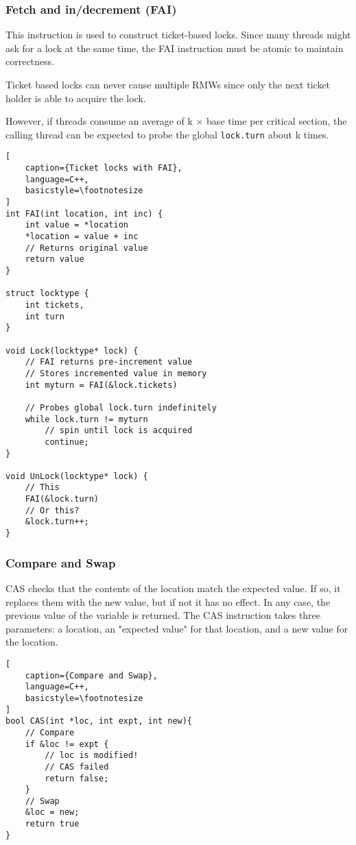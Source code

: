 \documentclass{article}
\begin{document}
\begin{multicols*}{2}
\subsubsection{Fetch and in/decrement (FAI)}
This instruction is used to construct ticket-based locks. Since many threads might ask for a lock at the same time, the FAI instruction must be atomic to maintain correctness.
\medskip\par\noindent
Ticket based locks can never cause multiple RMWs since only the next ticket holder is able to acquire the lock.
\medskip\par\noindent
However, if threads consume an average of k $\times$ base time per critical section, the calling thread can be expected to probe the global \texttt{lock.turn} about k times.

\begin{lstlisting}[
    caption={Ticket locks with FAI},
    language=C++, 
    basicstyle=\footnotesize
]
int FAI(int location, int inc) {
    int value = *location
    *location = value + inc
    // Returns original value
    return value
}

struct locktype {
    int tickets,
    int turn
}

void Lock(locktype* lock) {
    // FAI returns pre-increment value
    // Stores incremented value in memory
    int myturn = FAI(&lock.tickets)
    
    // Probes global lock.turn indefinitely
    while lock.turn != myturn
        // spin until lock is acquired
        continue;
}

void UnLock(locktype* lock) {
    // This
    FAI(&lock.turn)
    // Or this?
    &lock.turn++;
}
\end{lstlisting}

\subsubsection{Compare and Swap}
CAS checks that the contents of the location match the expected value. If so, it replaces them with the new value, but if not it has no effect. In any case, the previous value of the variable is returned. The CAS instruction takes three parameters: a location, an "expected value" for that location, and a new value for the location.

\begin{lstlisting}[
    caption={Compare and Swap},
    language=C++, 
    basicstyle=\footnotesize
]
bool CAS(int *loc, int expt, int new){
    // Compare
    if &loc != expt {
        // loc is modified!
        // CAS failed
        return false;
    }
    // Swap
    &loc = new;
    return true
}


\end{lstlisting}
\end{multicols*}
\end{document}
